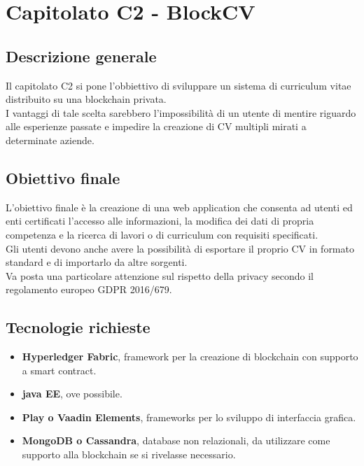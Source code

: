 \documentclass[StudioDiFattibilità.tex]{subfiles}
\begin{document}
\chapter{Capitolato C2 - BlockCV}
\section{Descrizione generale}
Il capitolato C2 si pone l'obbiettivo di sviluppare un sistema di curriculum vitae distribuito su una blockchain privata.\\
I vantaggi di tale scelta sarebbero l'impossibilità di un utente di mentire riguardo alle esperienze passate e impedire la creazione di CV multipli mirati a determinate aziende.
\section{Obiettivo finale}
L'obiettivo finale è la creazione di una web application che consenta ad utenti ed enti certificati l'accesso alle informazioni, la modifica dei dati di propria competenza e la ricerca di lavori o di curriculum con requisiti specificati.\\
Gli utenti devono anche avere la possibilità di esportare il proprio CV in formato standard e di importarlo da altre sorgenti.\\
Va posta una particolare attenzione sul rispetto della privacy secondo il regolamento europeo GDPR 2016/679.
\section{Tecnologie richieste}
\begin{itemize}
	\item \textbf{Hyperledger Fabric}, framework per la creazione di blockchain con supporto a smart contract.
	\item \textbf{java EE}, ove possibile.
	\item \textbf{Play o Vaadin Elements}, frameworks per lo sviluppo di interfaccia grafica.
	\item \textbf{MongoDB o Cassandra}, database non relazionali, da utilizzare come supporto alla blockchain se si rivelasse necessario.
\end{itemize}
\end{document}
